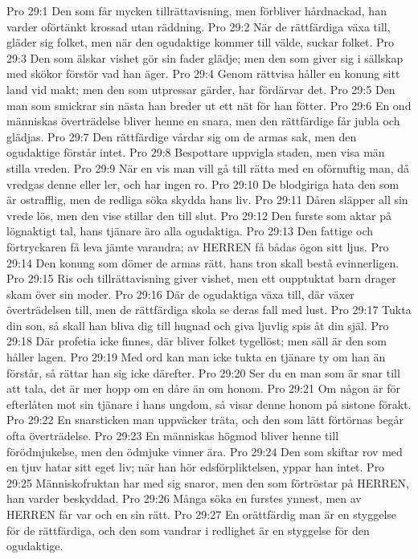 Pro 29:1  Den som får mycken tillrättavisning, men förbliver hårdnackad, han varder oförtänkt krossad utan räddning.
Pro 29:2  När de rättfärdiga växa till, gläder sig folket, men när den ogudaktige kommer till välde, suckar folket.
Pro 29:3  Den som älskar vishet gör sin fader glädje; men den som giver sig i sällskap med skökor förstör vad han äger.
Pro 29:4  Genom rättvisa håller en konung sitt land vid makt; men den som utpressar gärder, har fördärvar det.
Pro 29:5  Den man som smickrar sin nästa han breder ut ett nät för han fötter.
Pro 29:6  En ond människas överträdelse bliver henne en snara, men den rättfärdige får jubla och glädjas.
Pro 29:7  Den rättfärdige vårdar sig om de armas sak, men den ogudaktige förstår intet.
Pro 29:8  Bespottare uppvigla staden, men visa män stilla vreden.
Pro 29:9  När en vis man vill gå till rätta med en oförnuftig man, då vredgas denne eller ler, och har ingen ro.
Pro 29:10  De blodgiriga hata den som är ostrafflig, men de redliga söka skydda hans liv.
Pro 29:11  Dåren släpper all sin vrede lös, men den vise stillar den till slut.
Pro 29:12  Den furste som aktar på lögnaktigt tal, hans tjänare äro alla ogudaktiga.
Pro 29:13  Den fattige och förtryckaren få leva jämte varandra; av HERREN få bådas ögon sitt ljus.
Pro 29:14  Den konung som dömer de armas rätt. hans tron skall bestå evinnerligen.
Pro 29:15  Ris och tillrättavisning giver vishet, men ett oupptuktat barn drager skam över sin moder.
Pro 29:16  Där de ogudaktiga växa till, där växer överträdelsen till, men de rättfärdiga skola se deras fall med lust.
Pro 29:17  Tukta din son, så skall han bliva dig till hugnad och giva ljuvlig spis åt din själ.
Pro 29:18  Där profetia icke finnes, där bliver folket tygellöst; men säll är den som håller lagen.
Pro 29:19  Med ord kan man icke tukta en tjänare ty om han än förstår, så rättar han sig icke därefter.
Pro 29:20  Ser du en man som är snar till att tala, det är mer hopp om en dåre än om honom.
Pro 29:21  Om någon är för efterlåten mot sin tjänare i hans ungdom, så visar denne honom på sistone förakt.
Pro 29:22  En snarsticken man uppväcker träta, och den som lätt förtörnas begår ofta överträdelse.
Pro 29:23  En människas högmod bliver henne till förödmjukelse, men den ödmjuke vinner ära.
Pro 29:24  Den som skiftar rov med en tjuv hatar sitt eget liv; när han hör edsförpliktelsen, yppar han intet.
Pro 29:25  Människofruktan har med sig snaror, men den som förtröstar på HERREN, han varder beskyddad.
Pro 29:26  Många söka en furstes ynnest, men av HERREN får var och en sin rätt.
Pro 29:27  En orättfärdig man är en styggelse för de rättfärdiga, och den som vandrar i redlighet är en styggelse för den ogudaktige.
